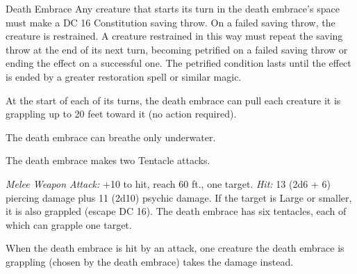 \documentclass[10pt,a4paper,twoside,fancy,bg=print,twocolumn,openany,nodeprecatedcode]{dndbook}
\begin{document}
\begin{DndMonster}[float=t]{Death Embrace}
\DndMonsterBasics[
armor-class = {13 (natural armor)},
hit-points = {\DndDice{14d12 + 56}},
speed = {0 ft., swim 20 ft.}
]
\DndMonsterAbilityScores[
 str = 23,
 dex = 15,
 con = 19,
 int = 6,
 wis = 9,
 cha = 4
]
\DndMonsterDetails[
saving-throws = {Str +10, Wis +3},
senses = {blindsight 60 ft. (blind beyond this radius), passive perception 9},
challenge = 11,
]
Any creature that starts its turn in the death embrace's space must make a DC 16 Constitution saving throw. On a failed saving throw, the creature is restrained. A creature restrained in this way must repeat the saving throw at the end of its next turn, becoming petrified on a failed saving throw or ending the effect on a successful one. The petrified condition lasts until the effect is ended by a greater restoration spell or similar magic.

At the start of each of its turns, the death embrace can pull each creature it is grappling up to 20 feet toward it (no action required).

The death embrace can breathe only underwater.

The death embrace makes two Tentacle attacks.

\textsl{Melee Weapon Attack:} +10 to hit, reach 60 ft., one target. \textsl{Hit:} 13 (2d6 + 6) piercing damage plus 11 (2d10) psychic damage. If the target is Large or smaller, it is also grappled (escape DC 16). The death embrace has six tentacles, each of which can grapple one target.

When the death embrace is hit by an attack, one creature the death embrace is grappling (chosen by the death embrace) takes the damage instead.

\end{DndMonster}
\end{document}
